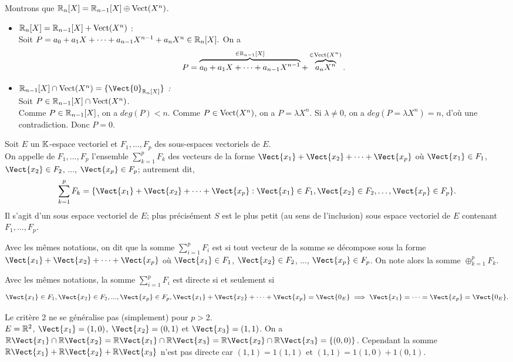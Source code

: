 \documentclass{book}
\begin{document}
\begin{Exemple}
Montrons que $\mathbb{R}_n[X]=\mathbb{R}_{n-1}[X]\oplus \operatorname{Vect}(X^n)$.\\
\begin{itemize}
\item \textit{$\mathbb{R}_n[X]=\mathbb{R}_{n-1}[X]+ \operatorname{Vect}(X^n) $} :\\
Soit $P =a_0+a_1 X+\dots+a_{n-1} X^{n-1}+a_{n} X^{n}\in \mathbb{R}_n[X].$
On a $$P =\overbrace{a_0+a_1 X+\dots+a_{n-1} X^{n-1}}^{\in \mathbb{R}_{n-1}[X]}+\overbrace{a_{n} X^{n}}^{\in \operatorname{Vect}(X^n)}.$$
\item \textit{$\R_{n-1}[X]\cap  \Vectt(X^n)=\{\Vect{0}_{\R_n[X]}\}$ :}\\
Soit $P \in \mathbb{R}_{n-1}[X]\cap \operatorname{Vect}(X^n)$.\\
Comme $P \in \mathbb{R}_{n-1}[X]$, on a $deg(P)<n$. Comme  $P \in \operatorname{Vect}(X^n)$, on a $P=\lambda X^n$. Si $\lambda\neq 0$, on a $deg(P=\lambda X^n)=n$, d'où une contradiction.  Donc $P=0$.  
\end{itemize}
\end{Exemple}
\begin{DefinitionProposition}[Somme]
Soit $E$ un $\mathbb{K}$-espace vectoriel et $F_1,\dots, F_p$ des sous-espaces vectoriels de $E$.\\
On appelle  de $F_1,\dots, F_p$ l'ensemble $ \sum_{k=1}^p F_k$ des vecteurs de la forme $\Vect{x_1} +\Vect{x_2}+ \dots + \Vect{x_p}$
où $\Vect{x_1}\in F_1$, $\Vect{x_2}\in F_2$, ..., $\Vect{x_p}\in F_p$;
autrement dit,
\[  \sum_{k=1}^p F_k = \{ \Vect{x_1} +\Vect{x_2}+ \dots + \Vect{x_p}: \Vect{x_1}\in F_1,\Vect{x_2}\in F_2,\dots, \Vect{x_p}\in F_p\}. \]
Il s'agit d'un sous espace vectoriel  de $E$;
plus précisément $S$ est le plus petit (au sens de l'inclusion) sous espace vectoriel  de $E$ contenant $F_1,\dots, F_p$.
\end{DefinitionProposition}


\begin{Definition}
Avec les mêmes notations, on dit que la somme $\sum_{i=1}^p F_i$ est  si tout vecteur de la somme se décompose  sous la forme $\Vect{x_1} +\Vect{x_2}+ \dots + \Vect{x_p}$ où $\Vect{x_1}\in F_1$, $\Vect{x_2}\in F_2$, ..., $\Vect{x_p}\in F_p$.
On note alors la somme $\oplus_{k=1}^p F_k$.
\end{Definition}
\begin{Proposition}[Critère 1]
Avec les mêmes notations, la somme $\sum_{i=1}^p F_i$ est directe si et seulement si
$$\Vect{x_1}\in F_1, \Vect{x_2}\in F_2, ..., \Vect{x_p}\in F_p,
 \Vect{x_1} +\Vect{x_2}+ \dots + \Vect{x_p} = \Vect{0_E} \implies \Vect{x_1} =\dots=\Vect{x_p}= \Vect{0_E}.$$
\end{Proposition}  
\begin{Remarque}
Le critère 2 ne se généralise pas (simplement) pour $p > 2$.\\
$E = \mathbb{R} ^2$, $\Vect{x_1} = (1,0)$, $\Vect{x_2} = (0,1)$ et $\Vect{x_3} = (1,1)$.
On a $\R \Vect{x_1} \cap \R \Vect{x_2} = \R \Vect{x_1} \cap \R \Vect{x_3} = \R \Vect{x_2} \cap \R \Vect{x_3} = \{(0,0)\}$. Cependant la somme $\R \Vect{x_1} + \R \Vect{x_2} + \R \Vect{x_3}$ n'est pas directe car $(1,1)=1(1,1)$ et $(1,1)=1(1,0)+1(0,1).$ 
\end{Remarque}
\end{document}
